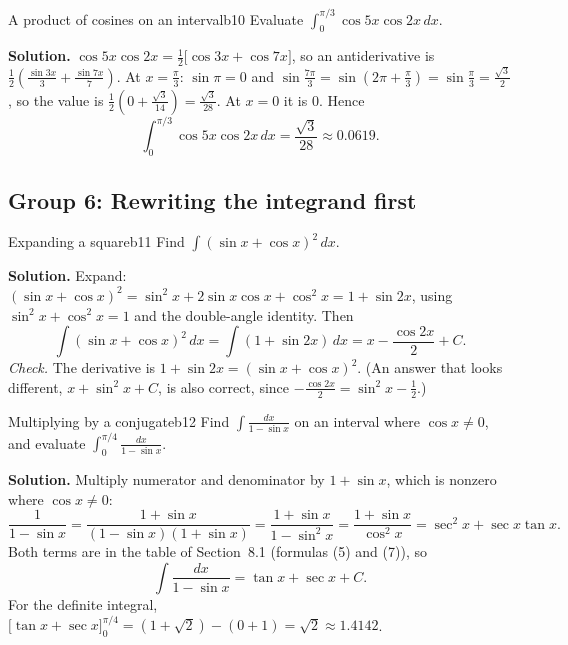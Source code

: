 \documentclass[11pt]{article}
\begin{document}
\begin{exmp}{A product of cosines on an interval}{b10}
Evaluate $\displaystyle\int_0^{\pi/3}\cos5x\cos2x\,dx$.

\textbf{Solution.} $\cos5x\cos2x=\frac12\big[\cos3x+\cos7x\big]$, so an antiderivative is $\frac12\left(\frac{\sin3x}3+\frac{\sin7x}7\right)$. At $x=\frac\pi3$: $\sin\pi=0$ and $\sin\frac{7\pi}3=\sin\left(2\pi+\frac\pi3\right)=\sin\frac\pi3=\frac{\sqrt3}2$, so the value is $\frac12\left(0+\frac{\sqrt3}{14}\right)=\frac{\sqrt3}{28}$. At $x=0$ it is $0$. Hence
\[\int_0^{\pi/3}\cos5x\cos2x\,dx=\frac{\sqrt3}{28}\approx0.0619 .\]
\end{exmp}

\subsection*{Group 6: Rewriting the integrand first}

\begin{exmp}{Expanding a square}{b11}
Find $\int(\sin x+\cos x)^2\,dx$.

\textbf{Solution.} Expand: $(\sin x+\cos x)^2=\sin^2x+2\sin x\cos x+\cos^2x=1+\sin2x$, using $\sin^2x+\cos^2x=1$ and the double-angle identity. Then
\[\int(\sin x+\cos x)^2\,dx=\int(1+\sin2x)\,dx=x-\frac{\cos2x}2+C .\]
\emph{Check.} The derivative is $1+\sin2x=(\sin x+\cos x)^2$. (An answer that looks different, $x+\sin^2x+C$, is also correct, since $-\frac{\cos2x}2=\sin^2x-\frac12$.)
\end{exmp}

\begin{exmp}{Multiplying by a conjugate}{b12}
Find $\int\frac{dx}{1-\sin x}$ on an interval where $\cos x\ne0$, and evaluate $\int_0^{\pi/4}\frac{dx}{1-\sin x}$.

\textbf{Solution.} Multiply numerator and denominator by $1+\sin x$, which is nonzero where $\cos x\ne0$:
\[\frac1{1-\sin x}=\frac{1+\sin x}{(1-\sin x)(1+\sin x)}=\frac{1+\sin x}{1-\sin^2x}=\frac{1+\sin x}{\cos^2x}=\sec^2x+\sec x\tan x .\]
Both terms are in the table of Section~8.1 (formulas (5) and (7)), so
\[\int\frac{dx}{1-\sin x}=\tan x+\sec x+C .\]
For the definite integral, $\big[\tan x+\sec x\big]_0^{\pi/4}=(1+\sqrt2)-(0+1)=\sqrt2\approx1.4142$.
\end{exmp}
\end{document}
